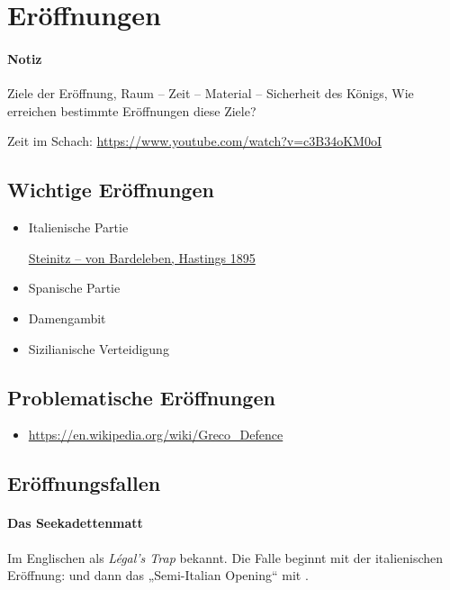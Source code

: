 \documentclass[
  a4paper,
  justified,
  nobib,
]{tufte-handout}
\newenvironment{notiz}{
  \color{Maroon}
  \paragraph*{Notiz}
}{
  \color{black}
}
\begin{document}
\section{Eröffnungen}%
\label{sec:eroffnungen}

\begin{notiz}
  Ziele der Eröffnung, Raum – Zeit – Material – Sicherheit des Königs, Wie erreichen
  bestimmte Eröffnungen diese Ziele?

  Zeit im Schach: \url{https://www.youtube.com/watch?v=c3B34oKM0oI}
\end{notiz}

\subsection{Wichtige Eröffnungen}%
\label{sub:wichtige_eroffnungen}

\begin{itemize}
  \item Italienische Partie

    \href{https://de.wikipedia.org/wiki/Steinitz_–_von_Bardeleben,_Hastings_1895}{Steinitz
    – von Bardeleben, Hastings 1895}
  \item Spanische Partie
  \item Damengambit
  \item Sizilianische Verteidigung
\end{itemize}

\subsection{Problematische Eröffnungen}%
\label{sub:problematische_eroffnungen}

\begin{itemize}
  \item \url{https://en.wikipedia.org/wiki/Greco_Defence}
\end{itemize}

\subsection{Eröffnungsfallen}%
\label{sub:eroffnungsfallen}

\paragraph{Das Seekadettenmatt}%
\label{par:das_seekadettenmatt}

\newchessgame

Im Englischen als \textit{Légal’s Trap} bekannt. Die Falle beginnt mit der italienischen
Eröffnung:  und dann das „Semi-Italian Opening“ mit
.
\end{document}
